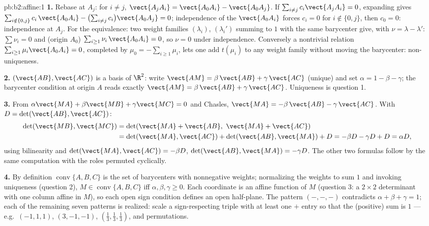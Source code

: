\begin{solution}{pb:b2:affine:1}
\textbf{1.} Rebase at $A_j$: for $i \neq j$, $\vect{A_jA_i} =
\vect{A_0A_i} - \vect{A_0A_j}$. If $\sum_{i \neq j}
c_i\vect{A_jA_i} = 0$, expanding gives $\sum_{i \notin \{0,
j\}} c_i\,\vect{A_0A_i} - \bigl(\sum_{i\neq j}
c_i\bigr)\vect{A_0A_j} = 0$; independence of the
$\vect{A_0A_i}$ forces $c_i = 0$ for $i \notin \{0, j\}$, then
$c_0 = 0$: independence at $A_j$. For the equivalence: two
weight families $(\lambda_i)$, $(\lambda_i')$ summing to $1$
with the same barycenter give, with $\nu = \lambda -
\lambda'$: $\sum\nu_i = 0$ and (origin $A_0$) $\sum_{i \geq
1}\nu_i\,\vect{A_0A_i} = 0$, so $\nu = 0$ under independence.
Conversely a nontrivial relation $\sum_{i\geq1}\mu_i
\vect{A_0A_i} = 0$, completed by $\mu_0 = -\sum_{i\geq1}
\mu_i$, lets one add $t(\mu_i)$ to any weight family without
moving the barycenter: non-uniqueness.

\textbf{2.} $(\vect{AB}, \vect{AC})$ is a basis of $\R^2$:
write $\vect{AM} = \beta\,\vect{AB} + \gamma\,\vect{AC}$
(unique) and set $\alpha = 1 - \beta - \gamma$; the barycenter
condition at origin $A$ reads exactly $\vect{AM} =
\beta\,\vect{AB} + \gamma\,\vect{AC}$. Uniqueness is question
1.

\textbf{3.} From $\alpha\vect{MA} + \beta\vect{MB} +
\gamma\vect{MC} = 0$ and Chasles, $\vect{MA} =
-\beta\,\vect{AB} - \gamma\,\vect{AC}$. With $D =
\det(\vect{AB}, \vect{AC})$:
\begin{align*}
\det(\vect{MB}, \vect{MC})
&= \det(\vect{MA} + \vect{AB},\ \vect{MA} + \vect{AC})\\
&= \det(\vect{MA}, \vect{AC}) + \det(\vect{AB}, \vect{MA}) +
D = -\beta D - \gamma D + D = \alpha D,
\end{align*}
using bilinearity and $\det(\vect{MA}, \vect{AC}) = -\beta D$,
$\det(\vect{AB}, \vect{MA}) = -\gamma D$. The other two
formulas follow by the same computation with the roles
permuted cyclically.

\textbf{4.} By definition $\operatorname{conv}\{A, B, C\}$ is
the set of barycenters with nonnegative weights; normalizing
the weights to sum $1$ and invoking uniqueness (question 2),
$M \in \operatorname{conv}\{A,B,C\}$ iff $\alpha, \beta,
\gamma \geq 0$. Each coordinate is an affine function of $M$
(question 3: a $2\times2$ determinant with one column affine
in $M$), so each open sign condition defines an open
half-plane. The pattern $(-,-,-)$ contradicts $\alpha + \beta
+ \gamma = 1$; each of the remaining seven patterns is
realized: scale a sign-respecting triple with at least one
$+$ entry so that the (positive) sum is $1$ --- e.g.\
$(-1, 1, 1)$, $(3, -1, -1)$, $(\frac13, \frac13, \frac13)$,
and permutations.


\end{solution}
